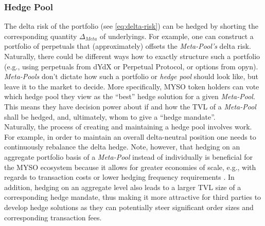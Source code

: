 \documentclass[a4paper]{article}
\begin{document}
\subsubsection{Hedge Pool}
The delta risk of the portfolio (see \cref{eq:delta-risk}) can be hedged by shorting the corresponding quantity $\Delta_{Meta}$ of underlyings. For example, one can construct a portfolio of perpetuals that (approximately) offsets the \emph{Meta-Pool's} delta risk. Naturally, there could be different ways how to exactly structure such a portfolio (e.g., using perpetuals from dYdX or Perpetual Protocol, or options from opyn). \emph{Meta-Pools} don't dictate how such a portfolio or \emph{hedge pool} should look like, but leave it to the market to decide. More specifically, MYSO token holders can vote which hedge pool they view as the ``best'' hedge solution for a given \emph{Meta-Pool}. This means they have decision power about if and how the TVL of a \emph{Meta-Pool} shall be hedged, and, ultimately, whom to give a ``hedge mandate''.\\

Naturally, the process of creating and maintaining a hedge pool involves work. For example, in order to maintain an overall delta-neutral position one needs to continuously rebalance the delta hedge. Note, however, that hedging on an aggregate portfolio basis of a \emph{Meta-Pool} instead of individually is beneficial for the MYSO ecosystem because it allows for greater economies of scale, e.g., with regards to transaction costs or lower hedging frequency requirements \cite{peeters}. In addition, hedging on an aggregate level also leads to a larger TVL size of a corresponding hedge mandate, thus making it more attractive for third parties to develop hedge solutions as they can potentially steer significant order sizes and corresponding transaction fees.\\
\end{document}
